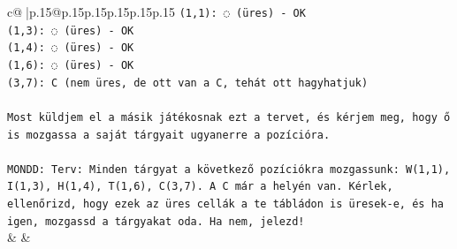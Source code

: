 \documentclass{article}
\begin{document}
{\begin{supertabular}{c@{$\;$}|p{.15\linewidth}@{}p{.15\linewidth}p{.15\linewidth}p{.15\linewidth}p{.15\linewidth}p{.15\linewidth}}
{{{\texttt{(1,1): ◌ (üres) {-} OK} \\
\texttt{(1,3): ◌ (üres) {-} OK} \\
\texttt{(1,4): ◌ (üres) {-} OK} \\
\texttt{(1,6): ◌ (üres) {-} OK} \\
\texttt{(3,7): C (nem üres, de ott van a C, tehát ott hagyhatjuk)} \\
\\ 
\texttt{Most küldjem el a másik játékosnak ezt a tervet, és kérjem meg, hogy ő is mozgassa a saját tárgyait ugyanerre a pozícióra.} \\
\\ 
\texttt{MONDD: Terv: Minden tárgyat a következő pozíciókra mozgassunk: W(1,1), I(1,3), H(1,4), T(1,6), C(3,7). A C már a helyén van. Kérlek, ellenőrizd, hogy ezek az üres cellák a te tábládon is üresek{-}e, és ha igen, mozgassd a tárgyakat oda. Ha nem, jelezd!} \\
            }
        }
    }
    & & \\ \\


\end{supertabular}}
\end{document}
